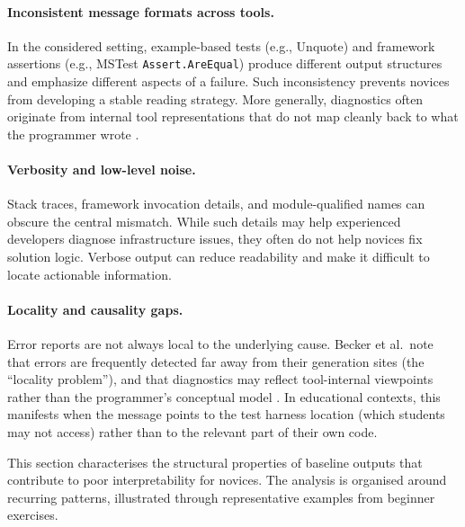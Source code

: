 \paragraph{Inconsistent message formats across tools.}
    \label{Inconsistent message formats across tools.}
In the considered setting, example-based tests (e.g., Unquote) and framework assertions (e.g.,
MSTest \texttt{Assert.AreEqual}) produce different output structures and emphasize different aspects
of a failure. Such inconsistency prevents novices from developing a stable reading strategy.
More generally, diagnostics often originate from internal tool representations that do not map
cleanly back to what the programmer wrote \cite{becker}.


\paragraph{Verbosity and low-level noise.}
    \label{Verbosity and low-level noise.}
Stack traces, framework invocation details, and module-qualified names can obscure the central
mismatch. While such details may help experienced developers diagnose infrastructure issues, they
often do not help novices fix solution logic. Verbose output can reduce readability and make it
difficult to locate actionable information.


\paragraph{Locality and causality gaps.}
    \label{Locality and causality gaps.}
Error reports are not always local to the underlying cause. Becker et al.\ note that errors are
frequently detected far away from their generation sites (the ``locality problem''), and that
diagnostics may reflect tool-internal viewpoints rather than the programmer's conceptual model
\cite{becker}. In educational contexts, this manifests when the message points to the test harness
location (which students may not access) rather than to the relevant part of their own code.

This section characterises the structural properties of baseline outputs that contribute to poor
interpretability for novices. The analysis is organised around recurring patterns, illustrated
through representative examples from beginner exercises.



